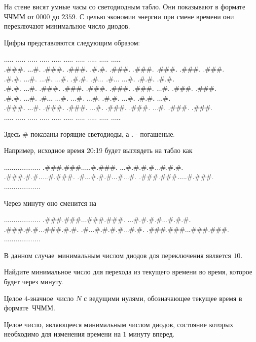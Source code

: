 
На стене висят умные часы со светодиодным табло. Они показывают в формате ЧЧММ от $0000$ до $2359$. С целью экономии энергии при смене времени они переключают минимальное число диодов.

Цифры представляются следующим образом:



..... ..... ..... ..... ..... ..... ..... ..... ..... .....\\
.\#\#\#. ...\#. .\#\#\#. .\#\#\#. .\#.\#. .\#\#\#. .\#\#\#. .\#\#\#. .\#\#\#. .\#\#\#.\\
.\#.\#. ...\#. ...\#. ...\#. .\#.\#. .\#... .\#... ...\#. .\#.\#. .\#.\#.\\
.\#.\#. ...\#. .\#\#\#. .\#\#\#. .\#\#\#. .\#\#\#. .\#\#\#. ...\#. .\#\#\#. .\#\#\#.\\
.\#.\#. ...\#. .\#... ...\#. ...\#. ...\#. .\#.\#. ...\#. .\#.\#. ...\#.\\
.\#\#\#. ...\#. .\#\#\#. .\#\#\#. ...\#. .\#\#\#. .\#\#\#. ...\#. .\#\#\#. .\#\#\#.\\
..... ..... ..... ..... ..... ..... ..... ..... ..... .....

Здесь \# показаны горящие светодиоды, а . - погашеные.

Например, исходное время 20:19 будет выглядеть на табло как

...................
.\#\#\#.\#\#\#.....\#.\#\#\#.
...\#.\#.\#.\#...\#.\#.\#.
.\#\#\#.\#.\#.....\#.\#\#\#.
.\#...\#.\#.\#...\#...\#.
.\#\#\#.\#\#\#.....\#.\#\#\#.
...................

Через минуту оно сменится на  

...................
.\#\#\#.\#\#\#...\#\#\#.\#\#\#.
...\#.\#.\#.\#...\#.\#.\#.
.\#\#\#.\#.\#...\#\#\#.\#.\#.
.\#...\#.\#.\#.\#...\#.\#.
.\#\#\#.\#\#\#...\#\#\#.\#\#\#.
...................


В данном случае минимальным числом диодов для переключения является $10$.

Найдите минимальное число для перехода из текущего времени во время, которое будет через минуту.


Целое $4$-значное число $N$ с ведущими нулями, обозначающее текущее время в формате ЧЧММ.

\outputfmtSection

Целое число, являющееся минимальным числом диодов, состояние которых необходимо для изменения времени на $1$ минуту вперед.

